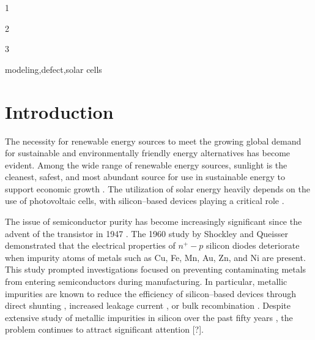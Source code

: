 \documentclass[a4paper,fleqn]{cas-sc}
\begin{document}
\begin{highlights}
\item 1
\item 2
\item 3
\end{highlights}

\begin{keywords}
 modeling\sep defect\sep solar cells
\end{keywords}

\maketitle

\section{Introduction}%
\par
The necessity for renewable energy sources to meet the growing global demand for sustainable and environmentally friendly energy alternatives has become evident. 
Among the wide range of renewable energy sources, sunlight is the cleanest, safest, 
and most abundant source for use in sustainable energy to support economic growth \cite{PratapSingh2019}.
The utilization of solar energy heavily depends on the use of photovoltaic cells, with silicon--based devices playing a critical role \cite{Basnet2024,Wang2024}.


The issue of semiconductor purity has become increasingly significant since the advent of the transistor in 1947 \cite{Claers2018}. 
The 1960 study by Shockley and Queisser \cite{Goetzberger1960} demonstrated that 
the electrical properties of $n^{+}-p$ silicon diodes deteriorate when impurity atoms of metals such as Cu, Fe, Mn, Au, Zn, and Ni are present. 
This study prompted investigations focused on preventing contaminating metals from entering semiconductors during manufacturing. 
In particular, metallic impurities are known to reduce the efficiency of 
silicon--based devices through direct shunting \cite{Rsh:Breitenstein}, increased leakage current \cite{Lee1980}, or bulk recombination \cite{Istratov2000}. 
Despite extensive study of metallic impurities in silicon over the past fifty years \cite{Claers2018,Pearce1977}, 
the problem continues to attract significant attention [?].
\end{document}

